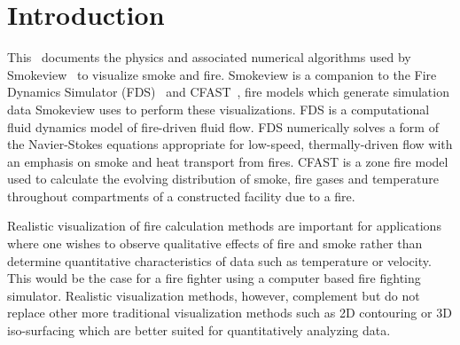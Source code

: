 

\section{Introduction}
This \paper\ documents the physics and associated numerical algorithms used by Smokeview~\cite{Smokeview_Users_Guide} to visualize smoke and fire.  Smokeview is a companion to the Fire Dynamics Simulator (FDS)~\cite{FDS_Math_Guide} and CFAST~\cite{Jones:2009}, fire models which generate   simulation data Smokeview uses to perform these visualizations. FDS is a computational fluid dynamics model of fire-driven fluid flow. FDS numerically solves a form of the Navier-Stokes equations appropriate for low-speed, thermally-driven flow with an emphasis on smoke and heat transport from fires.  CFAST is a zone fire model used to calculate the evolving distribution of smoke, fire gases and temperature throughout compartments of a constructed facility due to a fire.

Realistic visualization of fire calculation methods are important for applications where one wishes to observe qualitative effects of fire and smoke rather than determine quantitative characteristics of data such as temperature or velocity.  This would be the case for a fire fighter using a computer based fire fighting simulator. Realistic visualization methods, however, complement but do not replace other more traditional visualization methods such as 2D contouring or 3D iso-surfacing which are better suited for quantitatively analyzing data.

